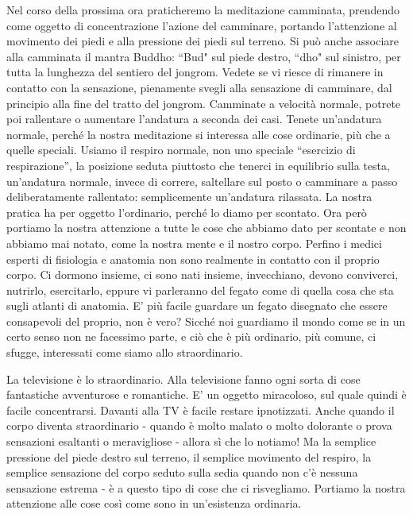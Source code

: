 
Nel corso della prossima ora praticheremo la meditazione camminata,
prendendo come oggetto di concentrazione l'azione del camminare,
portando l'attenzione al movimento dei piedi e alla pressione dei piedi
sul terreno. Si può anche associare alla camminata il mantra Buddho:
“Bud" sul piede destro, “dho" sul sinistro, per tutta la lunghezza del
sentiero del jongrom. Vedete se vi riesce di rimanere in contatto con la
sensazione, pienamente svegli alla sensazione di camminare, dal
principio alla fine del tratto del jongrom. Camminate a velocità
normale, potrete poi rallentare o aumentare l'andatura a seconda dei
casi. Tenete un'andatura normale, perché la nostra meditazione si
interessa alle cose ordinarie, più che a quelle speciali. Usiamo il
respiro normale, non uno speciale “esercizio di respirazione”, la
posizione seduta piuttosto che tenerci in equilibrio sulla testa,
un'andatura normale, invece di correre, saltellare sul posto o camminare
a passo deliberatamente rallentato: semplicemente un'andatura rilassata.
La nostra pratica ha per oggetto l'ordinario, perché lo diamo per
scontato. Ora però portiamo la nostra attenzione a tutte le cose che
abbiamo dato per scontate e non abbiamo mai notato, come la nostra mente
e il nostro corpo. Perfino i medici esperti di fisiologia e anatomia non
sono realmente in contatto con il proprio corpo. Ci dormono insieme, ci
sono nati insieme, invecchiano, devono conviverci, nutrirlo,
esercitarlo, eppure vi parleranno del fegato come di quella cosa che sta
sugli atlanti di anatomia. E' più facile guardare un fegato disegnato
che essere consapevoli del proprio, non è vero? Sicché noi guardiamo il
mondo come se in un certo senso non ne facessimo parte, e ciò che è più
ordinario, più comune, ci sfugge, interessati come siamo allo
straordinario.

La televisione è lo straordinario. Alla televisione fanno ogni sorta di
cose fantastiche avventurose e romantiche. E' un oggetto miracoloso, sul
quale quindi è facile concentrarsi. Davanti alla TV è facile restare
ipnotizzati. Anche quando il corpo diventa straordinario - quando è
molto malato o molto dolorante o prova sensazioni esaltanti o
meravigliose - allora sì che lo notiamo! Ma la semplice pressione del
piede destro sul terreno, il semplice movimento del respiro, la semplice
sensazione del corpo seduto sulla sedia quando non c'è nessuna
sensazione estrema - è a questo tipo di cose che ci risvegliamo.
Portiamo la nostra attenzione alle cose così come sono in un'esistenza
ordinaria.

